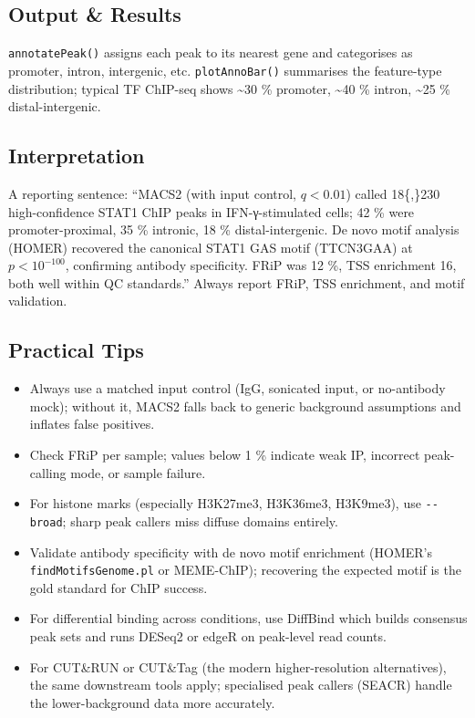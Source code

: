 \documentclass[
]{article}
\providecommand{\tightlist}{%
  \setlength{\itemsep}{0pt}\setlength{\parskip}{0pt}}
\begin{document}
\subsection{Output \& Results}\label{output-results}

\texttt{annotatePeak()} assigns each peak to its nearest gene and
categorises as promoter, intron, intergenic, etc. \texttt{plotAnnoBar()}
summarises the feature-type distribution; typical TF ChIP-seq shows
\textasciitilde30 \% promoter, \textasciitilde40 \% intron,
\textasciitilde25 \% distal-intergenic.

\subsection{Interpretation}\label{interpretation}

A reporting sentence: ``MACS2 (with input control, \(q < 0.01\)) called
18\{,\}230 high-confidence STAT1 ChIP peaks in IFN-γ-stimulated cells;
42 \% were promoter-proximal, 35 \% intronic, 18 \% distal-intergenic.
De novo motif analysis (HOMER) recovered the canonical STAT1 GAS motif
(TTCN3GAA) at \(p < 10^{-100}\), confirming antibody specificity. FRiP
was 12 \%, TSS enrichment 16, both well within QC standards.'' Always
report FRiP, TSS enrichment, and motif validation.

\subsection{Practical Tips}\label{practical-tips}

\begin{itemize}
\tightlist
\item
  Always use a matched input control (IgG, sonicated input, or
  no-antibody mock); without it, MACS2 falls back to generic background
  assumptions and inflates false positives.
\item
  Check FRiP per sample; values below 1 \% indicate weak IP, incorrect
  peak-calling mode, or sample failure.
\item
  For histone marks (especially H3K27me3, H3K36me3, H3K9me3), use
  \texttt{-\/-broad}; sharp peak callers miss diffuse domains entirely.
\item
  Validate antibody specificity with de novo motif enrichment (HOMER's
  \texttt{findMotifsGenome.pl} or MEME-ChIP); recovering the expected
  motif is the gold standard for ChIP success.
\item
  For differential binding across conditions, use DiffBind which builds
  consensus peak sets and runs DESeq2 or edgeR on peak-level read
  counts.
\item
  For CUT\&RUN or CUT\&Tag (the modern higher-resolution alternatives),
  the same downstream tools apply; specialised peak callers (SEACR)
  handle the lower-background data more accurately.
\end{itemize}
\end{document}
